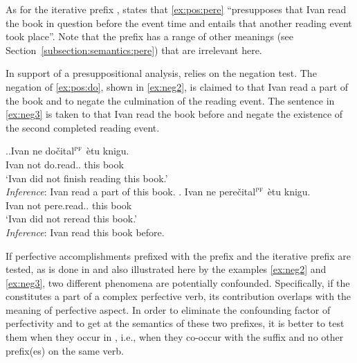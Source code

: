 As for the iterative prefix , \citet[145]{Kagan:book} states that \ref{ex:pos:pere} ``presupposes that Ivan read the book in question before the event time and entails that another reading event took place''. Note that the prefix  has a range of other meanings (see Section~\ref{subsection:semantics:pere}) that are irrelevant here.

In support of a presuppositional analysis, \citet{Kagan:book} relies on the negation test. The negation of \ref{ex:pos:do}, shown in \ref{ex:neg2}, is claimed to  that Ivan read a part of the book and to negate the culmination of the reading event. The sentence in \ref{ex:neg3} is taken to  that Ivan read the book before and negate the existence of the second completed reading event.

\ex.\ag.\label{ex:neg2}Ivan ne do\v{c}ital$^{\textsc{pf}}$ \`{e}tu knigu.\\
Ivan not do.read.. this book\\
\trans `Ivan did not finish reading this book.'\\
\textit{Inference}: Ivan read a part of this book.
\bg. \label{ex:neg3}Ivan ne pere\v{c}ital$^{\textsc{pf}}$ \`{e}tu knigu.\\
Ivan not pere.read.. this book\\
\trans `Ivan did not reread this book.'\\
\textit{Inference}: Ivan read this book before.

If perfective accomplishments prefixed with the  prefix  and the iterative prefix  are tested, as is done in \citealt{Kagan:book} and also illustrated here by the examples \ref{ex:neg2} and \ref{ex:neg3}, two different phenomena are potentially confounded. Specifically, if the   constitutes a part of a complex perfective verb, its contribution overlaps with the meaning of perfective aspect. In order to eliminate the confounding factor of perfectivity and to get at the semantics of these two prefixes, it is better to test them when they occur in , i.e., when they co-occur with the  suffix and no other prefix(es) on the same verb.

